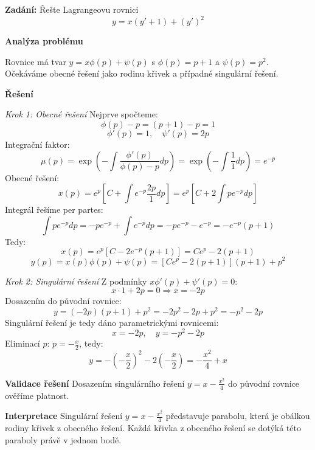 \begin{example}
\label{ex:zakladni-lagrange}

\noindent\textbf{Zadání:} Řešte Lagrangeovu rovnici
\[
y = x(y' + 1) + (y')^2
\]

\vspace{1.5\baselineskip}

\noindent\textbf{Analýza problému}

Rovnice má tvar $y = x\phi(p) + \psi(p)$ s $\phi(p) = p + 1$ a $\psi(p) = p^2$. Očekáváme obecné řešení jako rodinu křivek a případné singulární řešení.

\vspace{1.5\baselineskip}

\noindent\textbf{Řešení}

\noindent\textit{Krok 1: Obecné řešení}
Nejprve spočteme:
\[
\phi(p) - p = (p + 1) - p = 1
\]
\[
\phi'(p) = 1, \quad \psi'(p) = 2p
\]
Integrační faktor:
\[
\mu(p) = \exp\left(-\int \frac{\phi'(p)}{\phi(p)-p} dp\right) = \exp\left(-\int \frac{1}{1} dp\right) = e^{-p}
\]
Obecné řešení:
\[
x(p) = e^{p} \left[ C + \int e^{-p} \frac{2p}{1} dp \right] = e^{p} \left[ C + 2\int p e^{-p} dp \right]
\]
Integrál řešíme per partes:
\[
\int p e^{-p} dp = -p e^{-p} + \int e^{-p} dp = -p e^{-p} - e^{-p} = -e^{-p}(p + 1)
\]
Tedy:
\[
x(p) = e^{p} \left[ C - 2e^{-p}(p + 1) \right] = Ce^{p} - 2(p + 1)
\]
\[
y(p) = x(p)\phi(p) + \psi(p) = [Ce^{p} - 2(p + 1)](p + 1) + p^2
\]

\vspace{1\baselineskip}

\noindent\textit{Krok 2: Singulární řešení}
Z podmínky $x\phi'(p) + \psi'(p) = 0$:
\[
x\cdot 1 + 2p = 0 \Rightarrow x = -2p
\]
Dosazením do původní rovnice:
\[
y = (-2p)(p + 1) + p^2 = -2p^2 - 2p + p^2 = -p^2 - 2p
\]
Singulární řešení je tedy dáno parametrickými rovnicemi:
\[
x = -2p, \quad y = -p^2 - 2p
\]
Eliminací $p$: $p = -\frac{x}{2}$, tedy:
\[
y = -\left(-\frac{x}{2}\right)^2 - 2\left(-\frac{x}{2}\right) = -\frac{x^2}{4} + x
\]

\vspace{1.5\baselineskip}

\noindent\textbf{Validace řešení}
Dosazením singulárního řešení $y = x - \frac{x^2}{4}$ do původní rovnice ověříme platnost.

\vspace{1.5\baselineskip}

\noindent\textbf{Interpretace}
Singulární řešení $y = x - \frac{x^2}{4}$ představuje parabolu, která je obálkou rodiny křivek z obecného řešení. Každá křivka z obecného řešení se dotýká této paraboly právě v jednom bodě.

\end{example}

